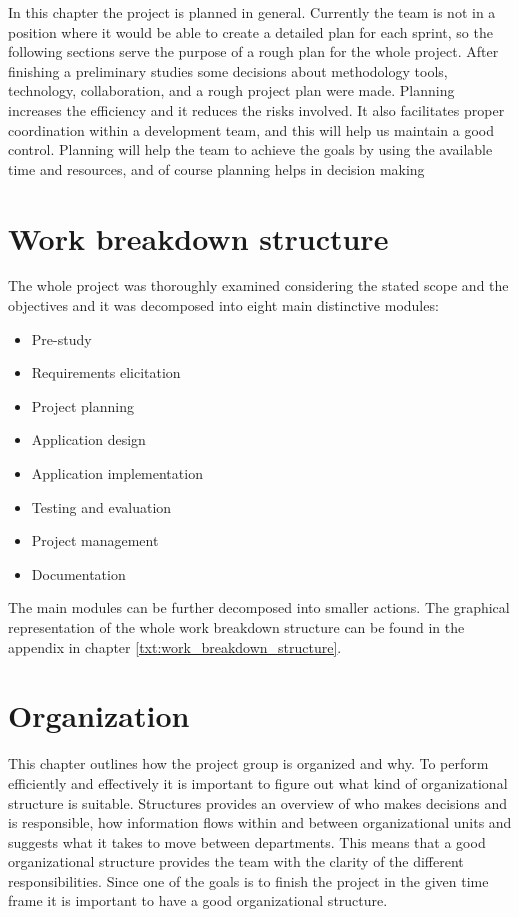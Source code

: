 In this chapter the project is planned in general. Currently the team is not in a position where it would be able to create a detailed plan for each sprint, so the following sections serve the purpose of a rough plan for the whole project. After finishing a preliminary studies some decisions about methodology tools, technology, collaboration, and a rough project plan were made. Planning increases the efficiency and it reduces the risks involved. It also facilitates proper coordination within a development team, and this will help us maintain a good control. Planning will help the team to achieve the goals by using the available time and resources, and of course planning helps in decision making  

\section{Work breakdown structure}
\label{sec:wbs}
The whole project was thoroughly examined  considering the stated scope and the objectives and it was decomposed into eight main distinctive modules:

\begin{itemize}
\item Pre-study
\item Requirements elicitation
\item Project planning
\item Application design
\item Application implementation
\item Testing and evaluation
\item Project management
\item Documentation
\end{itemize}

The main modules can be further decomposed into smaller actions. The graphical representation of the whole work breakdown structure can be found in the appendix in chapter \ref{txt:work_breakdown_structure}.

\section{Organization}
This chapter outlines how the project group is organized and why.
To perform efficiently and effectively it is important to figure out what kind of organizational structure is suitable. 
Structures provides an overview of who makes decisions and is responsible, how information flows within and between organizational units and suggests what it takes to move between departments. This means that a good organizational structure provides the team with the clarity of the different responsibilities. Since one of the goals is to finish the project in the given time frame it is important to have a good organizational structure.

